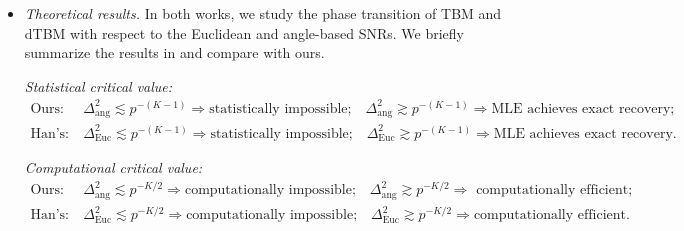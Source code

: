 \documentclass[lettersize,onecolumn,journal]{IEEEtran}
\theoremstyle{definition}
\theoremstyle{definition}
\newtheorem{example}{Example}
\begin{document}
{\begin{itemize}[wide]
\begin{example}[Comparison with Euclidean-based signal notion] \label{example:euc_alg} Consider a biclustering model with $\mtheta=1$ and an order-2 core matrix 
\begin{equation}
    \mS = \begin{pmatrix} p^{(\gamma+1)/2 } + 2  & 2 p^{(\gamma+1)/2} + 4\\
    2 & 4
    \end{pmatrix},\quad \text{with}\ \gamma \leq -1.
\end{equation}
The core matrix $\mS$ lies in the parameter spaces of TBM and our dTBM. Here, the constraint $\gamma \leq -1$ is added to ensure the bounded condition of $\mS$ in our parameter space in \eqref{eq:family}. The angle-based and Euclidean-based signal levels of $\mS$ are 
\begin{equation}
    \Delta_{\text{ang }}^2(\mS) = 0 \ \left(\leq p^{\gamma}\right), \quad \Delta_{\text{Euc}}^2(\mS) = 5 p^{\gamma + 1} \ \left(\geq p^{\gamma}\right).
\end{equation}
We conclude that TBM with $\mS$ achieves exact recovery with a polynomial-time algorithm; see \citet[Theorem 4]{han2020exact}. By contrast, the dTBM with the same $\mS$ and input $r=2$ violets the identifiability condition, and thus fails to be solved by all estimators; see our Theorem~\ref{thm:unique}. 
\end{example}
    
    \item \textit{Theoretical results.} In both works, we study the phase transition of TBM and dTBM with respect to the Euclidean and angle-based SNRs. We briefly summarize the results in \cite{han2020exact} and compare with ours. 
    
    \textit{Statistical critical value:}
    \begin{align}
        \text{Ours:}& \ \Delta_{\text{ang}}^2 \lesssim p^{-(K-1)} \Rightarrow \text{statistically impossible;} \quad \Delta_{\text{ang}}^2 \gtrsim   p^{-(K-1)} \Rightarrow \text{MLE achieves exact recovery;} \\
        \text{Han's:}& \ \Delta_{\text{Euc}}^2 \lesssim p^{-(K-1)} \Rightarrow \text{statistically impossible;} \quad \Delta_{\text{Euc}}^2 \gtrsim   p^{-(K-1)} \Rightarrow \text{MLE achieves exact recovery}.
    \end{align}
    
     \textit{Computational critical value:}
    \begin{align}
        \text{Ours:}& \ \Delta_{\text{ang}}^2 \lesssim p^{-K/2} \Rightarrow \text{computationally impossible;} \quad \Delta_{\text{ang}}^2 \gtrsim   p^{-K/2} \Rightarrow \text{ computationally efficient;} \\
        \text{Han's:}& \ \Delta_{\text{Euc}}^2 \lesssim p^{-K/2} \Rightarrow \text{computationally impossible;} \quad \Delta_{\text{Euc}}^2 \gtrsim   p^{-K/2} \Rightarrow \text{computationally efficient}.
    \end{align}


\end{itemize}}
\end{document}
